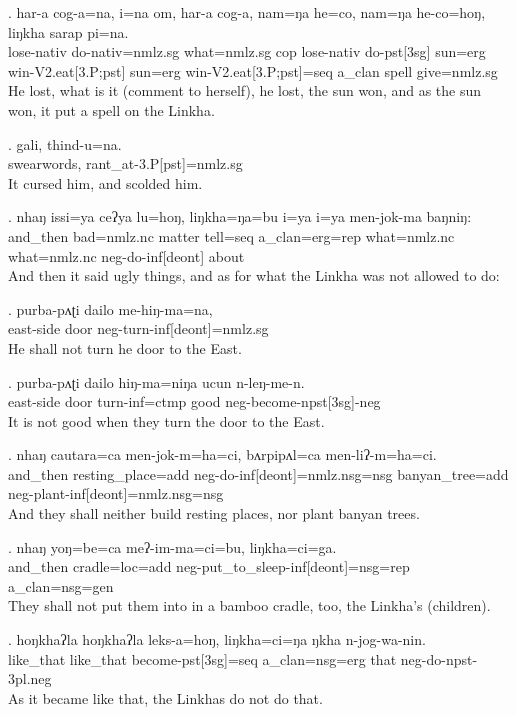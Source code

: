 \exg. har-a cog-a=na, i=na om, har-a cog-a, nam=ŋa he=co, nam=ŋa he-co=hoŋ, liŋkha sarap pi=na.\\
lose{\sc -nativ} do{\sc -nativ=nmlz.sg} what{\sc =nmlz.sg} cop lose{\sc -nativ} do{\sc -pst[3sg]} sun{\sc =erg} win{\sc -V2.eat[3.P;pst]} sun{\sc =erg} win{\sc -V2.eat[3.P;pst]=seq} a\_clan spell give{\sc [3.A;3.P]=nmlz.sg}\\
He lost, what is it (comment to herself), he lost, the sun won, and as the sun won, it put a spell on the Linkha.


\exg. gali, thind-u=na.\\
swearwords, rant\_at{\sc -3.P[pst]=nmlz.sg}\\
It cursed him, and scolded him.


\exg. nhaŋ issi=ya ceʔya lu=hoŋ, liŋkha=ŋa=bu i=ya i=ya men-jok-ma baŋniŋ:\\
and\_then bad{\sc =nmlz.nc} matter tell{\sc =seq} a\_clan{\sc =erg=rep} what{\sc =nmlz.nc} what{\sc =nmlz.nc} {\sc neg-}do{\sc -inf[deont]} about\\
And then it said ugly things, and as for what the Linkha was not allowed to do:


\exg. purba-pʌʈi dailo me-hiŋ-ma=na,\\
east-side door {\sc neg-}turn{\sc -inf[deont]=nmlz.sg}\\
He shall not turn he door to the East.


\exg. purba-pʌʈi dailo hiŋ-ma=niŋa ucun n-leŋ-me-n.\\
east-side door turn{\sc -inf=ctmp} good {\sc neg-}become{\sc -npst[3sg]-neg}\\
It is not good when they turn the door to the East.


\exg. nhaŋ cautara=ca men-jok-m=ha=ci, bʌrpipʌl=ca men-liʔ-m=ha=ci.\\
and\_then resting\_place{\sc =add} {\sc neg-}do{\sc -inf[deont]=nmlz.nsg=nsg} banyan\_tree{\sc =add} {\sc neg-}plant{\sc -inf[deont]=nmlz.nsg=nsg}\\
And they shall neither build resting places, nor plant banyan trees.


\exg. nhaŋ yoŋ=be=ca meʔ-im-ma=ci=bu, liŋkha=ci=ga.\\
and\_then cradle{\sc =loc=add} {\sc neg-}put\_to\_sleep{\sc -inf[deont]=nsg=rep} a\_clan{\sc =nsg=gen}\\
They shall not put them into in a bamboo cradle, too, the Linkha's (children).


\exg. hoŋkhaʔla hoŋkhaʔla leks-a=hoŋ, liŋkha=ci=ŋa ŋkha n-jog-wa-nin.\\
like\_that like\_that become{\sc -pst[3sg]=seq} a\_clan{\sc =nsg=erg} that {\sc neg-}do{\sc -npst-3pl.neg}\\
As it became like that, the Linkhas do not do that.



